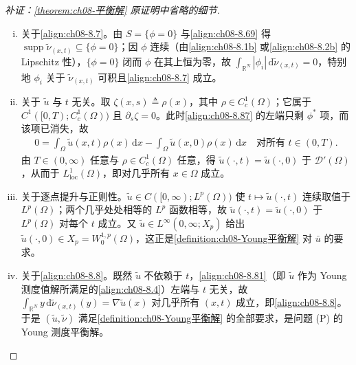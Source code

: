 \documentclass[../../main.tex]{subfiles}%
\begin{document}
\begin{proof}[补证：\cref{theorem:ch08-平衡解} 原证明中省略的细节]
\begin{enumerate}[(i)]
\item 关于\eqref{align:ch08-8.7}。由 $S=\{\phi=0\}$ 与\eqref{align:ch08-8.69} 得 $\operatorname{supp}\tilde\nu_{(x,t)}\subseteq\{\phi=0\}$；因 $\phi$ 连续（由\eqref{align:ch08-8.1b} 或\eqref{align:ch08-8.2b} 的 Lipschitz 性），$\{\phi=0\}$ 闭而 $\phi$ 在其上恒为零，故 $\int_{\mathbb{R}^N}|\phi_i|\,\mathrm{d}\tilde\nu_{(x,t)}=0$，特别地 $\phi_i$ 关于 $\tilde\nu_{(x,t)}$ 可积且\eqref{align:ch08-8.7} 成立。
\item 关于 $\tilde u$ 与 $t$ 无关。取 $\zeta(x,s)\triangleq\rho(x)$，其中 $\rho\in C^1_c(\Omega)$；它属于 $C^1([0,T);C^1_c(\Omega))$ 且 $\partial_s\zeta=0$。此时\eqref{align:ch08-8.87} 的左端只剩 $\phi^*$ 项，而该项已消失，故
\begin{align*}
0=\int_\Omega\tilde u(x,t)\rho(x)\,\mathrm{d}x-\int_\Omega\tilde u(x,0)\rho(x)\,\mathrm{d}x\quad\text{对所有 }t\in(0,T).
\end{align*}
由 $T\in(0,\infty)$ 任意与 $\rho\in C^1_c(\Omega)$ 任意，得 $\tilde u(\cdot,t)=\tilde u(\cdot,0)$ 于 $\mathcal{D}'(\Omega)$，从而于 $L^1_{\mathrm{loc}}(\Omega)$，即对几乎所有 $x\in\Omega$ 成立。
\item 关于逐点提升与正则性。$\tilde u\in C([0,\infty);L^p(\Omega))$ 使 $t\mapsto\tilde u(\cdot,t)$ 连续取值于 $L^p(\Omega)$；两个几乎处处相等的 $L^p$ 函数相等，故 $\tilde u(\cdot,t)=\tilde u(\cdot,0)$ 于 $L^p(\Omega)$ 对每个 $t$ 成立。又 $\tilde u\in L^\infty(0,\infty;X_p)$ 给出 $\tilde u(\cdot,0)\in X_p=W^{1,p}_0(\Omega)$，这正是\cref{definition:ch08-Young平衡解} 对 $\bar u$ 的要求。
\item 关于\eqref{align:ch08-8.8}。既然 $\tilde u$ 不依赖于 $t$，\eqref{align:ch08-8.81}（即 $\tilde u$ 作为 Young 测度值解所满足的\eqref{align:ch08-8.4}）左端与 $t$ 无关，故 $\int_{\mathbb{R}^N}y\,\mathrm{d}\tilde\nu_{(x,t)}(y)=\nabla\tilde u(x)$ 对几乎所有 $(x,t)$ 成立，即\eqref{align:ch08-8.8}。于是 $(\tilde u,\tilde\nu)$ 满足\cref{definition:ch08-Young平衡解} 的全部要求，是问题 (P) 的 Young 测度平衡解。
\end{enumerate}
\end{proof}
\end{document}
